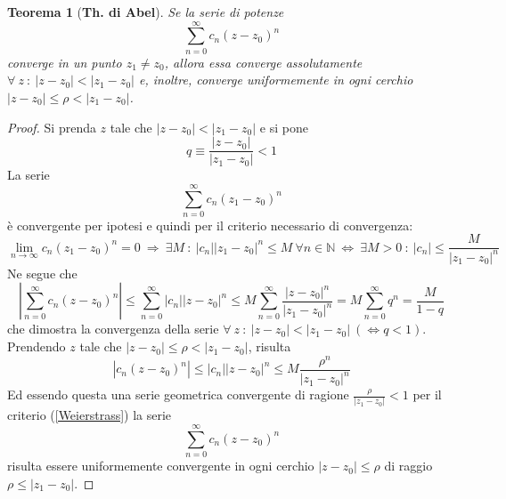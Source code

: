 \documentclass[twoside]{article}
\newtheorem{theorem}{Teorema}[section]
\begin{document}
\begin{theorem}[\textbf{Th. di Abel}] \label{Abel}
Se la serie di potenze
\begin{equation}
    \sum_{n=0}^{\infty} c_n(z-z_0)^n
\end{equation}
converge in un punto $z_1\ne z_0$, allora essa converge assolutamente $\forall \ z \ : \ |z-z_0|<|z_1 - z_0|$ e, inoltre, converge uniformemente in ogni cerchio $|z-z_0|\leq \rho < |z_1 - z_0|$.
\end{theorem}

\begin{proof}
Si prenda $z$ tale che  $|z-z_0|<|z_1 - z_0|$ e si pone
\begin{equation}
    q\equiv \frac{|z-z_0|}{|z_1 - z_0|}<1
\end{equation}
La serie
\begin{equation}
    \sum_{n=0}^{\infty} c_n(z_1 -z_0)^n
\end{equation}
è convergente per ipotesi e quindi per il criterio necessario di convergenza:
\begin{equation*}
    \lim_{n \to \infty}c_n(z_1-z_0)^n=0 \ \Rightarrow \ \exists M \ : \ |c_n||z_1 - z_0|^n \leq M \ \forall n \in \mathds{N} \ \iff \ \exists M>0 \ : \ |c_n|\leq \frac{M}{|z_1 - z_0|^n}
\end{equation*}
Ne segue che
\begin{equation}
    \left|\sum_{n=0}^{\infty} c_n (z-z_0)^n\right|\leq \sum_{n=0}^{\infty} |c_n||z-z_0|^n \leq M\sum_{n=0}^{\infty} \frac{|z-z_0|^n}{|z_1-z_0|^n}=M\sum_{n=0}^{\infty}q^n=\frac{M}{1-q}
\end{equation}
che dimostra la convergenza della serie $\forall \ z \ : \ |z-z_0|<|z_1-z_0| \ (\iff q<1)$.
\\
Prendendo $z$ tale che $|z-z_0|\leq \rho <|z_1-z_0|$, risulta
\begin{equation}
    |c_n(z-z_0)^n|\leq |c_n||z-z_0|^n\leq M\frac{\rho^n}{|z_1 -z_0|^n}
\end{equation}
Ed essendo questa una serie geometrica convergente di ragione $\frac{\rho}{|z_1 - z_0|}<1$ per il criterio (\ref{Weierstrass}) la serie
\begin{equation}
    \sum_{n=0}^{\infty}c_n(z-z_0)^n
\end{equation}
risulta essere uniformemente convergente in ogni cerchio $|z-z_0|\leq \rho$ di raggio $\rho \leq |z_1-z_0|$.
\end{proof}
\end{document}
